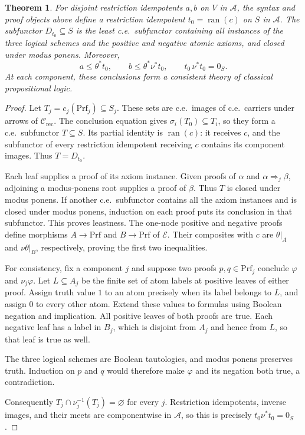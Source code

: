 \documentclass[11pt]{article}
\newtheorem{theorem}{Theorem}[section]
\newcommand{\ran}{\operatorname{ran}}
\begin{document}
\begin{theorem}\label{thm:fork-proof-presentation}
For disjoint restriction idempotents $a,b$ on $V$ in $\mathcal A$, the syntax and
proof objects above define a restriction idempotent $t_0=\ran(c)$ on $S$ in
$\mathcal A$. The subfunctor $D_{t_0}\subseteq S$ is the least c.e.\
subfunctor containing all instances of the three logical schemes and the
positive and negative atomic axioms, and closed under modus ponens.
Moreover,
\[
 a\le\theta^*t_0,\qquad
 b\le\theta^*\nu^*t_0,\qquad
 t_0\,\nu^*t_0=0_S.
\]
At each component, these conclusions form a consistent theory of
classical propositional logic.
\end{theorem}
\begin{proof}
Let $T_j=c_j(\mathrm{Prf}_j)\subseteq S_j$.
These sets are c.e.\ images of c.e.\ carriers under
arrows of $\mathcal C_{\mathrm{rec}}$. The conclusion equation gives
$\sigma_i(T_0)\subseteq T_i$, so they form a c.e.\
subfunctor $T\subseteq S$. Its partial identity is
$\ran(c)$: it receives $c$, and the subfunctor of every restriction
idempotent receiving $c$ contains its component images. Thus $T=D_{t_0}$.

Each leaf supplies a proof of its axiom instance. Given proofs
of $\alpha$ and $\alpha\Rightarrow_j\beta$, adjoining a
modus-ponens root supplies a proof of $\beta$. Thus $T$ is
closed under modus ponens. If another c.e.\ subfunctor contains all
the axiom instances and is closed under modus ponens, induction
on each proof puts its conclusion in that subfunctor. This
proves leastness. The one-node positive and negative proofs define
morphisms $A\to\mathrm{Prf}$ and $B\to\mathrm{Prf}$ of $\mathcal E$.
Their composites with $c$ are $\theta|_A$ and
$\nu\theta|_B$, respectively, proving the first two inequalities.

For consistency, fix a component $j$ and suppose two proofs
$p,q\in\mathrm{Prf}_j$ conclude $\varphi$ and $\nu_j\varphi$.
Let $L\subseteq A_j$ be the finite set of atom labels at
positive leaves of either proof. Assign truth value $1$ to an
atom precisely when its label belongs to $L$, and assign $0$
to every other atom. Extend these values to formulas using
Boolean negation and implication.
All positive leaves of both proofs are true. Each negative
leaf has a label in $B_j$, which is disjoint from $A_j$ and
hence from $L$, so that leaf is true as well.

The three logical schemes are Boolean tautologies, and modus
ponens preserves truth. Induction on
$p$ and $q$ would therefore make $\varphi$ and its negation
both true, a contradiction.

Consequently $T_j\cap\nu_j^{-1}(T_j)=\varnothing$ for every
$j$. Restriction idempotents, inverse images, and their meets are componentwise
in $\mathcal A$, so this is precisely $t_0\nu^*t_0=0_S$.
\end{proof}
\end{document}
